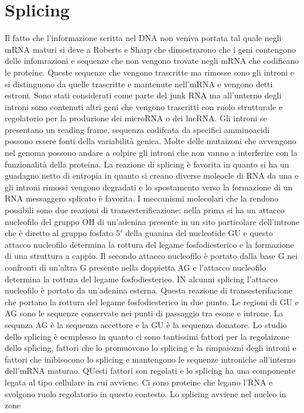\section{Splicing}
Il fatto che l'informazione scritta nel DNA non veniva portata tal quale negli mRNA maturi si deve a Roberts e Sharp che dimostrarono che i geni contengono delle infomrazioni e sequenze
che non vengono trovate negli mRNA che codificano le proteine. Queste sequenze che vengono trascritte ma rimosse sono gli introni e si distinguono da quelle trascritte e mantenute 
nell'mRNA e vengono detti estroni. Sono stati considerati come parte del junk RNA ma all'unterno degli introni sono contenuti altri geni che vengono trascritti con ruolo strutturale e
regolatorio per la produzione dei microRNA o dei lncRNA. Gli introni se presentano un reading frame, sequenza codifcata da specifici amminoacidi possono essere fonti della variabilit\`a
genica. Molte delle mutaizoni che avvengono nel genoma possono andare a colpire gli introni che non vanno a interferire con la funzionalit\`a della proteina. La reazione di splicing 
\`e favorita in quanto si ha un guadagno netto di entropia in quanto si creano diverse moleocle di RNA da una e gli introni rimossi vengono degradati e lo spostamento verso la formazione
di un RNA messaggero splicato \`e favorita. I meccanismi molecolari che la rendono possibili sono due reazioni di transesterificazione: nella prima si ha un attacco nucleofilo del gruppo
OH di un'adenina presente in un sito particolare dell'introne che \`e diretto al gruppo fosfato $5'$ della guanina del nucleotide GU e questo attacco nucleofilo determina la rottura 
del legame fosfodiesterico e la formazione di una struttura a cappio. Il secondo attacco nucleofilo \`e portato dalla base G nei confronti di un'altra G presente nella doppietta AG e 
l'attacco nucleofilo determina la rottura del legame fosfodiesterico. IN alcunni splicing l'attacco nucleofilo \`e portato da un'adenina esterna. Questa reazione di transesterifacione
che portano la rottura del legame fosfodiesterico in due punto. Le regioni di GU e AG sono le sequenze conservate nei punti di passaggio tra esone e introne. La sequnza AG \`e la sequenza
accettore e la GU \`e la sequenza donatore. Lo studio dello splicing \`e ocmplesso in quanto ci sono tantissimi fattori per la regolaizone dello splicing, fattori che lo promuovono lo 
splicing e la rimpaiozni degli introni e fattori che inibisocono lo splicing e mantengono le sequenze introniche all'interno dell'mRNA maturao. QUesti fattori son regolati e lo splicing
ha una componente legata al tipo cellulare in cui avviene. Ci sono proteine che legano l'RNA e svolgono ruolo regolatorio in questo contesto. Lo splicing avviene nel nucleo in zone 
